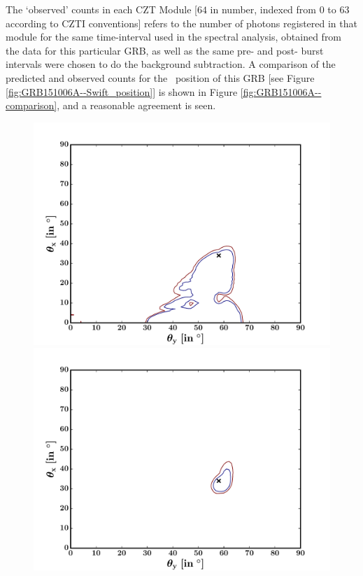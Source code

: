 The `observed' counts in each CZT Module [$64$ in number, indexed from $0$ to $63$ according to CZTI conventions] refers to the number of photons registered in that module for the same time-interval used in the spectral analysis, obtained from the data for this particular GRB, as well as the same pre- and post- burst intervals were chosen to do the background subtraction. A comparison of the predicted and observed counts for the \s\ position of this GRB [see Figure \ref{fig:GRB151006A--Swift_position}] is shown in Figure \ref{fig:GRB151006A--comparison}, and a reasonable agreement is seen.

\begin{figure}
\begin{center}
\includegraphics[scale=0.34]{GRB151006A--contours}
\includegraphics[scale=0.34]{GRB151006A--contours_sim}

\end{center}
\end{figure}
